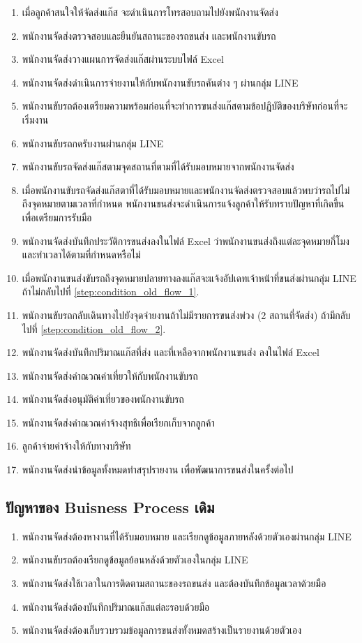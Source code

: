 \begin{enumerate}
    \item เมื่อลูกค้าสนใจให้จัดส่งแก๊ส จะดำเนินการโทรสอบถามไปยังพนักงานจัดส่ง
    \item พนักงานจัดส่งตรวจสอบและยืนยันสถานะของรถขนส่ง และพนักงานขับรถ
    \item พนักงานจัดส่งวางแผนการจัดส่งแก๊สผ่านระบบไฟล์ Excel
    \item พนักงานจัดส่งดำเนินการจ่ายงานให้กับพนักงานขับรถคันต่าง ๆ ผ่านกลุ่ม LINE
    \item พนักงานขับรถต้องเตรียมความพร้อมก่อนที่จะทำการขนส่งแก๊สตามข้อปฎิบัติของบริษัทก่อนที่จะเริ่มงาน
    \item พนักงานขับรถกดรับงานผ่านกลุ่ม LINE
    \item พนักงานขับรถจัดส่งแก๊สตามจุดสถานที่ตามที่ได้รับมอบหมายจากพนักงานจัดส่ง \label{step:condition_old_flow_2}
    \item เมื่อพนักงานขับรถจัดส่งแก๊สตาที่ได้รับมอบหมายและพนักงานจัดส่งตรวจสอบแล้วพบว่ารถไปไม่ถึงจุดหมายตามเวลาที่กำหนด พนักงานขนส่งจะดำเนินการแจ้งลูกค้าให้รับทราบปัญหาที่เกิดขึ้นเพื่อเตรียมการรับมือ \label{step:condition_old_flow_1}
    \item พนักงานจัดส่งบันทึกประวัติการขนส่งลงในไฟล์ Excel ว่าพนักงานขนส่งถึงแต่ละจุดหมายกี่โมง และทำเวลาได้ตามที่กำหนดหรือไม่
    \item เมื่อพนักงานขนส่งขับรถถึงจุดหมายปลายทางลงแก๊สจะแจ้งอัปเดทเจ้าหน้่าที่ขนส่งผ่านกลุ่ม LINE ถ้าไม่กลับไปที่ \ref{step:condition_old_flow_1}.
    \item พนักงานขับรถกลับเดินทางไปยังจุดจ่ายงานถ้าไม่มีรายการขนส่งพ่วง (2 สถานที่จัดส่ง) ถ้ามีกลับไปที่ \ref{step:condition_old_flow_2}.
    \item พนักงานจัดส่งบันทึกปริมาณแก๊สที่ส่ง และที่เหลือจากพนักงานขนส่ง ลงในไฟล์ Excel
    \item พนักงานจัดส่งคำณวณค่าเที่ยวให้กับพนักงานขับรถ
    \item พนักงานจัดส่งอนุมัติค่าเที่ยวของพนักงานขับรถ
    \item พนักงานจัดส่งคำณวณค่าจ้างสุทธิเพื่อเรียกเก็บจากลูกค้า
    \item ลูกค้าจ่ายค่าจ้างให้กับทางบริษัท
    \item พนักงานจัดส่งนำข้อมูลทั้งหมดทำสรุปรายงาน เพื่อพัฒนาการขนส่งในครั้งต่อไป
\end{enumerate}

\subsection{ปัญหาของ Buisness Process เดิม}
\begin{enumerate}
    \item พนักงานจัดส่งต้องหางานที่ได้รับมอบหมาย และเรียกดูข้อมูลภายหลังด้วยตัวเองผ่านกลุ่ม LINE
    \item พนักงานขับรถต้องเรียกดูข้อมูลย้อนหลังด้วยตัวเองในกลุ่ม LINE
    \item พนักงานจัดส่งใช้เวลาในการติดตามสถานะของรถขนส่ง และต้องบันทึกข้อมูลเวลาด้วยมือ
    \item พนักงานจัดส่งต้องบันทึกปริมาณแก๊สแต่ละรอบด้วยมือ
    \item พนักงานจัดส่งต้องเก็บรวบรวมข้อมูลการขนส่งทั้งหมดสร้างเป็นรายงานด้วยตัวเอง
\end{enumerate}


